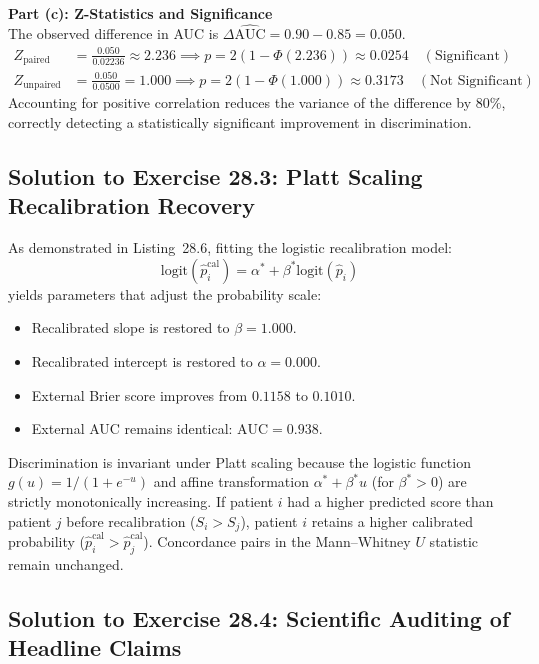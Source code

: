 \documentclass[11pt,twoside,openright]{book}
\begin{document}
\noindent
\textbf{Part (c): Z-Statistics and Significance}\\
The observed difference in AUC is $\Delta\widehat{\text{AUC}} = 0.90 - 0.85 = 0.050$.
\begin{align}
Z_{\text{paired}} &= \frac{0.050}{0.02236} \approx 2.236 \implies p = 2(1 - \Phi(2.236)) \approx 0.0254 \quad (\text{Significant}) \\
Z_{\text{unpaired}} &= \frac{0.050}{0.0500} = 1.000 \implies p = 2(1 - \Phi(1.000)) \approx 0.3173 \quad (\text{Not Significant})
\end{align}
Accounting for positive correlation reduces the variance of the difference by $80\%$, correctly detecting a statistically significant improvement in discrimination.

\subsection{Solution to Exercise 28.3: Platt Scaling Recalibration Recovery}

As demonstrated in Listing~28.6, fitting the logistic recalibration model:
\begin{equation}
\text{logit}(\hat{p}_i^{\text{cal}}) = \alpha^* + \beta^* \text{logit}(\hat{p}_i)
\end{equation}
yields parameters that adjust the probability scale:
\begin{itemize}
    \item Recalibrated slope is restored to $\beta = 1.000$.
    \item Recalibrated intercept is restored to $\alpha = 0.000$.
    \item External Brier score improves from $0.1158$ to $0.1010$.
    \item External AUC remains identical: $\text{AUC} = 0.938$.
\end{itemize}
Discrimination is invariant under Platt scaling because the logistic function $g(u) = 1 / (1 + e^{-u})$ and affine transformation $\alpha^* + \beta^* u$ (for $\beta^* > 0$) are strictly monotonically increasing. If patient $i$ had a higher predicted score than patient $j$ before recalibration ($S_i > S_j$), patient $i$ retains a higher calibrated probability ($\hat{p}_i^{\text{cal}} > \hat{p}_j^{\text{cal}}$). Concordance pairs in the Mann--Whitney $U$ statistic remain unchanged.

\subsection{Solution to Exercise 28.4: Scientific Auditing of Headline Claims}
\end{document}
